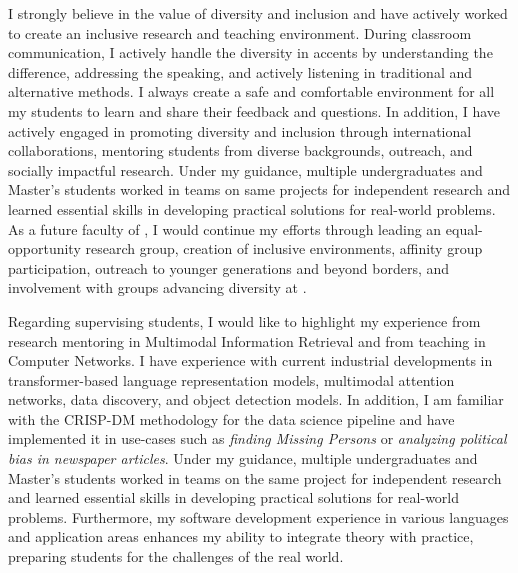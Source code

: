 \documentclass[10pt]{article}
\renewcommand*\paragraph[1]{}
\begin{document}
\paragraph{Diversity}
I strongly believe in the value of diversity and inclusion and have actively worked to create an inclusive research and teaching environment. During classroom communication, I actively handle the diversity in accents by understanding the difference, addressing the speaking, and actively listening in traditional and alternative methods.
I always create a safe and comfortable environment for all my students to learn and share their feedback and questions. In addition, I have actively engaged in promoting diversity and inclusion through international collaborations, mentoring students from diverse backgrounds, outreach, and socially impactful research. Under my guidance, multiple undergraduates and Master's students worked in teams on same projects for independent research and learned essential skills in developing practical solutions for real-world problems. As a future faculty of \shortInstitutionName{}, I would continue my efforts through leading an equal-opportunity research group, creation of inclusive environments, affinity group participation, outreach to younger generations and beyond borders, and involvement with groups advancing diversity at \shortInstitutionName{}. 

\paragraph{P3) Relevant industrial experience beneficial to CS/ DS curriculum development and CS/DS capstone project advising}
Regarding supervising students, I would like to highlight my experience from research mentoring in Multimodal Information Retrieval and from teaching in Computer Networks. I have experience with current industrial developments in transformer-based language representation models, multimodal attention networks, data discovery, and object detection models. 
In addition, I am familiar with the CRISP-DM methodology for the data science pipeline and have implemented it in use-cases such as \textit{finding Missing Persons} or \textit{analyzing political bias in newspaper articles}. Under my guidance, multiple undergraduates and Master's students worked in teams on the same project for independent research and learned essential skills in developing practical solutions for real-world problems.  
Furthermore, my software development experience in various languages and application areas enhances my ability to integrate theory with practice, preparing students for the challenges of the real world.
\end{document}
